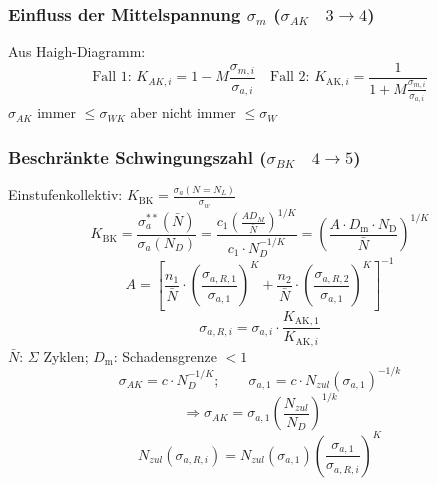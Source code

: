         \subsubsection{Einfluss der Mittelspannung $\sigma_m$ ($\sigma_{AK}\quad3\rightarrow4$)}
            Aus Haigh-Diagramm:
            \[\textrm{Fall 1: }\boxed{K_{AK,i}=1-M\frac{\sigma_{m,i}}{\sigma_{a,i}}}\quad\textrm{Fall 2: }\boxed{K_{\textrm{AK},i}=\frac{1}{1+M\frac{\sigma_{m,i}}{\sigma_{a,i}}}}\]
            $\sigma_{AK}$ immer $\leq\sigma_{WK}$ aber nicht immer $\leq\sigma_W$
        \subsubsection{Beschränkte Schwingungszahl ($\sigma_{BK}\quad4\rightarrow5$)}
            Einstufenkollektiv: $\displaystyle K_{\textrm{BK}}= \frac{\sigma_{a}(N=N_L)}{\sigma_w}$\\
            \[\boxed{ K_{\textrm{BK}}=\frac{\sigma_{a}^{**}(\bar{N})}{\sigma_{a}(N_{D})}=\frac{c_1\left(\frac{AD_M}{\bar{N}}\right)^{1/K}}{c_1\cdot N_D^{-1/K}}=\left(\frac{A\cdot D_{\textrm{m}}\cdot N_{\textrm{D}}}{\bar{N}}\right)^{1/K}}\]
            \[\boxed{A = \left[\frac{n_1}{\bar{N}}\cdot\left(\frac{\sigma_{a,R,1}}{\sigma_{a,1}}\right)^{K}+\frac{n_2}{\bar{N}}\cdot\left(\frac{\sigma_{a,R,2}}{\sigma_{a,1}}\right)^{K}\right]^{-1}}\]
            \[ \sigma_{a,R,i}=\sigma_{a,i}\cdot\frac{K_{\textrm{AK},1}}{K_{\textrm{AK},i}}\]
            $\bar{N}$: $\Sigma$ Zyklen; \qquad $D_{\textrm{m}}$: Schadensgrenze $<1$
            \[\sigma_{AK}=c\cdot N_D^{-1/K}; \qquad \sigma_{a,1}= c\cdot N_{zul}(\sigma_{a,1})^{-1/k}\]
            \[\Rightarrow \sigma_{AK}= \sigma_{a,1}\left(\frac{N_{zul}}{N_D}\right)^{1/k}\]
            \[N_{zul}(\sigma_{a,R,i})=N_{zul}(\sigma_{a,1})\left(\frac{\sigma_{a,1}}{\sigma_{a,R,i}}\right)^K\]

\vfill\null\columnbreak